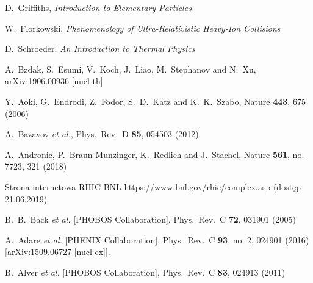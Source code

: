 \documentclass[a4paper,12pt]{article}
\begin{document}
\newpage
\begin{thebibliography}{9}
 D.~Griffiths, \textit{Introduction to Elementary Particles}

 W.~Florkowski, \textit{Phenomenology of Ultra-Relativistic Heavy-Ion Collisions}

 D.~Schroeder, \textit{An Introduction to Thermal Physics}

A.~Bzdak, S.~Esumi, V.~Koch, J.~Liao, M.~Stephanov and N.~Xu,
  arXiv:1906.00936 [nucl-th]

  Y.~Aoki, G.~Endrodi, Z.~Fodor, S.~D.~Katz and K.~K.~Szabo,
  Nature {\bf 443}, 675 (2006)

  A.~Bazavov {\it et al.},
  Phys.\ Rev.\ D {\bf 85}, 054503 (2012)

  A.~Andronic, P.~Braun-Munzinger, K.~Redlich and J.~Stachel,
  Nature {\bf 561}, no. 7723, 321 (2018)

 Strona internetowa RHIC BNL https://www.bnl.gov/rhic/complex.asp (dostęp 21.06.2019)

  B.~B.~Back {\it et al.} [PHOBOS Collaboration],
  Phys.\ Rev.\ C {\bf 72}, 031901 (2005)

  A.~Adare {\it et al.} [PHENIX Collaboration],
  Phys.\ Rev.\ C {\bf 93}, no. 2, 024901 (2016)
  [arXiv:1509.06727 [nucl-ex]].

  B.~Alver {\it et al.} [PHOBOS Collaboration],
  Phys.\ Rev.\ C {\bf 83}, 024913 (2011)


\end{thebibliography}
\end{document}
